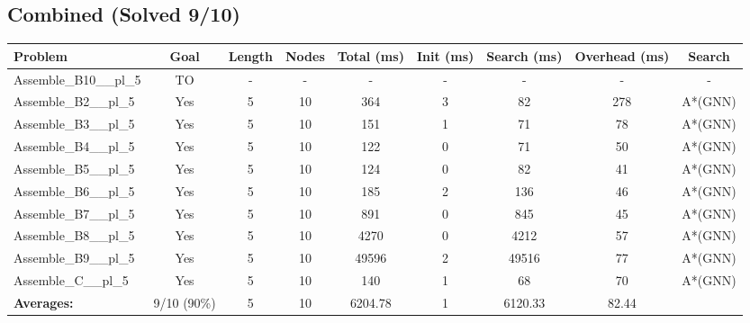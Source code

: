 \documentclass{article}
\begin{document}
\subsection*{Combined (Solved 9/10)}
\begin{tabular}{lcccccccc}
\toprule
Problem & Goal & Length & Nodes & Total (ms) & Init (ms) & Search (ms) & Overhead (ms) & Search \\
\midrule
Assemble\_B10\_\_pl\_5 & TO & - & - & - & - & - & - & - \\
Assemble\_B2\_\_pl\_5 & Yes & 5 & 10 & 364 & 3 & 82 & 278 & A*(GNN) \\
Assemble\_B3\_\_pl\_5 & Yes & 5 & 10 & 151 & 1 & 71 & 78 & A*(GNN) \\
Assemble\_B4\_\_pl\_5 & Yes & 5 & 10 & 122 & 0 & 71 & 50 & A*(GNN) \\
Assemble\_B5\_\_pl\_5 & Yes & 5 & 10 & 124 & 0 & 82 & 41 & A*(GNN) \\
Assemble\_B6\_\_pl\_5 & Yes & 5 & 10 & 185 & 2 & 136 & 46 & A*(GNN) \\
Assemble\_B7\_\_pl\_5 & Yes & 5 & 10 & 891 & 0 & 845 & 45 & A*(GNN) \\
Assemble\_B8\_\_pl\_5 & Yes & 5 & 10 & 4270 & 0 & 4212 & 57 & A*(GNN) \\
Assemble\_B9\_\_pl\_5 & Yes & 5 & 10 & 49596 & 2 & 49516 & 77 & A*(GNN) \\
Assemble\_C\_\_pl\_5 & Yes & 5 & 10 & 140 & 1 & 68 & 70 & A*(GNN) \\
\textbf{Averages:} & 9/10 (90\%) & 5 & 10 & 6204.78 & 1 & 6120.33 & 82.44 & \\
\bottomrule
\end{tabular}
\\[0.7cm]
\end{document}
